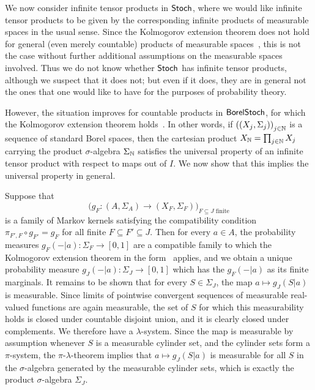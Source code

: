 \documentclass[11pt]{article}
\begin{document}
\begin{example}

	\label{infprods_stoch}
	We now consider infinite tensor products in $\operatorname{\mathsf{Stoch}}$, where we would like infinite tensor products to be given by the corresponding infinite products of measurable spaces in the usual sense. Since the Kolmogorov extension theorem does not hold for general (even merely countable) products of measurable spaces~\cite{AJ}, this is not the case without further additional assumptions on the measurable spaces involved. Thus we do not know whether $\operatorname{\mathsf{Stoch}}$ has infinite tensor products, although we suspect that it does not; but even if it does, they are in general not the ones that one would like to have for the purposes of probability theory.

	However, the situation improves for countable products in $\operatorname{\mathsf{BorelStoch}}$, for which the Kolmogorov extension theorem holds~\cite[Theorem~14.35]{klenke}. In other words, if $\left( (X_j, \Sigma_j) \right)_{j \in \mathbb{N}}$ is a sequence of standard Borel spaces, then the cartesian product $X_{\mathbb{N}} = \prod_{j \in \mathbb{N}} X_j$ carrying the product $\sigma$-algebra $\Sigma_{\mathbb{N}}$ satisfies the universal property of an infinite tensor product with respect to maps out of $I$. We now show that this implies the universal property in general.

	Suppose that
	\[
		\Big( g_F : (A,\Sigma_A) \longrightarrow (X_F, \Sigma_F) \Big)_{F \subseteq J \text{ finite}}
	\]
	is a family of Markov kernels satisfying the compatibility condition $\pi_{F',F} \circ g_{F'} = g_F$ for all finite $F \subseteq F' \subseteq J$. Then for every $a \in A$, the probability measures $g_F(-|a) : \Sigma_F \to [0,1]$ are a compatible family to which the Kolmogorov extension theorem in the form~\cite[Theorem~14.35]{klenke} applies, and we obtain a unique probability measure $g_J(-|a) : \Sigma_J \to [0,1]$ which has the $g_F(-|a)$ as its finite marginals. It remains to be shown that for every $S \in \Sigma_J$, the map $a \mapsto g_J(S|a)$ is measurable. Since limits of pointwise convergent sequences of measurable real-valued functions are again measurable, the set of $S$ for which this measurability holds is closed under countable disjoint union, and it is clearly closed under complements. We therefore have a $\lambda$-system. Since the map is measurable by assumption whenever $S$ is a measurable cylinder set, and the cylinder sets form a $\pi$-system, the $\pi$-$\lambda$-theorem implies that $a \mapsto g_J(S|a)$ is measurable for all $S$ in the $\sigma$-algebra generated by the measurable cylinder sets, which is exactly the product $\sigma$-algebra $\Sigma_J$.


\end{example}
\end{document}
